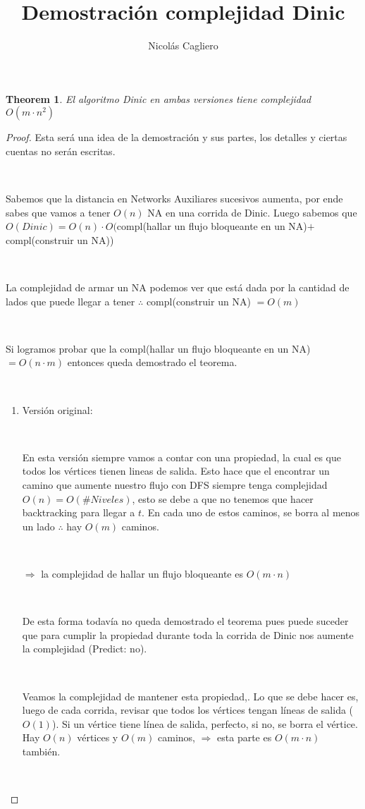 \documentclass[11pt]{article}
\title{Demostración complejidad Dinic }
\author{Nicolás Cagliero}
\newtheorem{theorem}{Theorem}
\begin{document}
\maketitle
\begin{theorem}
El algoritmo Dinic en ambas versiones tiene complejidad $O(m \cdot n^{2}) $
\end{theorem}

\begin{proof}
Esta será una idea de la demostración y sus partes, los detalles y ciertas cuentas no serán escritas.\par
\

Sabemos que la distancia en Networks Auxiliares sucesivos aumenta, por ende sabes que vamos a tener $O(n)$ NA en una corrida de Dinic. Luego sabemos que $O(Dinic) = O(n) \cdot O($compl(hallar un flujo bloqueante en un NA)$ + $compl(construir un NA))\par
\

La complejidad de armar un NA podemos ver que está dada por la cantidad de lados que puede llegar a tener $\therefore$ compl(construir un NA) $ = O(m)$\par
\

Si logramos probar que la compl(hallar un flujo bloqueante en un NA) $ = O(n \cdot m)$ entonces queda demostrado el teorema.\par
\

\begin{enumerate}

\item Versión original:\par
\

En esta versión siempre vamos a contar con una propiedad, la cual es que todos los vértices tienen lineas de salida. Esto hace que el encontrar un camino que aumente nuestro flujo con DFS siempre tenga complejidad $O(n) = O(\# Niveles)$, esto se debe a que no tenemos que hacer backtracking para llegar a $t$. En cada uno de estos caminos, se borra al menos un lado $\therefore$ hay $O(m)$ caminos.\par
\

$\Rightarrow$ la complejidad de hallar un flujo bloqueante es $O(m \cdot n)$\par
\

De esta forma todavía no queda demostrado el teorema pues puede suceder que para cumplir la propiedad durante toda la corrida de Dinic nos aumente la complejidad (Predict: no).\par
\

Veamos la complejidad de mantener esta propiedad,. Lo que se debe hacer es, luego de cada corrida, revisar que todos los vértices tengan líneas de salida ($O(1)$). Si un vértice tiene línea de salida, perfecto, si no, se borra el vértice. Hay $O(n)$ vértices y $O(m)$ caminos, $\Rightarrow$ esta parte es $O(m \cdot n)$ también.\par
\


\end{enumerate}
\end{proof}
\end{document}

